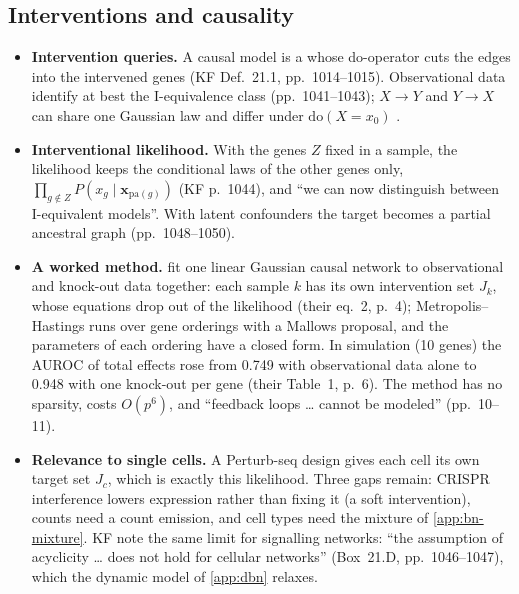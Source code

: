 \documentclass[11pt,a4paper]{article}
\begin{document}
\subsection{Interventions and causality}\label{app:causal}

\begin{itemize}
  \item \textbf{Intervention queries.} A causal model is a  whose do-operator cuts the edges into
        the intervened genes (KF Def.~21.1, pp.~1014--1015). Observational data identify at best the
        I-equivalence class (pp.~1041--1043); $X\to Y$ and $Y\to X$ can share one Gaussian law and differ under
        $\mathrm{do}(X=x_0)$ .
  \item \textbf{Interventional likelihood.} With the genes $Z$ fixed in a sample, the likelihood keeps the
        conditional laws of the other genes only, $\prod_{g\notin Z}P(x_g\mid\bm x_{\mathrm{pa}(g)})$ (KF p.~1044), and
        \enquote{we can now distinguish between I-equivalent models}. With latent confounders the target becomes a
        partial ancestral graph (pp.~1048--1050).
  \item \textbf{A worked method.} \textcite{rauJointEstimationCausal2013} fit one linear Gaussian causal network to observational and knock-out data
        together: each sample $k$ has its own intervention set $J_k$, whose equations drop out of the likelihood
        (their eq.~2, p.~4); Metropolis--Hastings runs over gene orderings with a Mallows proposal, and the
        parameters of each ordering have a closed form. In simulation (10 genes) the AUROC of total effects rose from
        0.749 with observational data alone to 0.948 with one knock-out per gene (their Table~1, p.~6). The method
        has no sparsity, costs $O(p^6)$, and \enquote{feedback loops … cannot be modeled} (pp.~10--11).
  \item \textbf{Relevance to single cells.} A Perturb-seq design gives each cell its own target set $J_c$, which
        is exactly this likelihood. Three gaps remain: CRISPR interference lowers expression rather than fixing
        it (a soft intervention), counts need a count emission, and cell types need the mixture of
        \cref{app:bn-mixture}. KF note the same limit for signalling networks: \enquote{the assumption of
        acyclicity … does not hold for cellular networks} (Box~21.D, pp.~1046--1047), which the dynamic model of
        \cref{app:dbn} relaxes.
\end{itemize}
\end{document}
